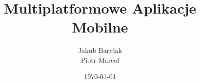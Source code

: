 %
%
%
% 
%
%

\documentclass[12pt,a4paper,titlepage,hidelinks]{article}

\usepackage[utf8]{inputenc}
\usepackage[polish]{babel}
\usepackage[T1]{fontenc}
\usepackage{subfiles}
\usepackage{float}
\usepackage{hyperref}
\usepackage{color}
\usepackage{amsmath}
\usepackage{hyperref}
\usepackage{graphicx}

\usepackage{mathpazo} %


\newcommand\myemptypage{
	\null
	\thispagestyle{empty}
	\newpage
}

\newcommand\pageCounterMinusOne{
	\addtocounter{page}{-1}
}

\title{\Huge{Multiplatformowe Aplikacje Mobilne}}

\author{Jakub Barylak\\Piotr Marcol}
\date{\today}






